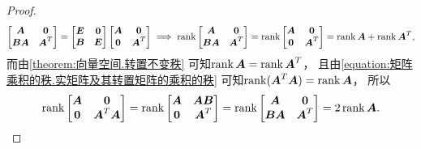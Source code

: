 \begin{example}
\begin{proof}
\begin{gather*}
	\begin{bmatrix}
		\boldsymbol{A} & \boldsymbol0 \\
		\boldsymbol{B} \boldsymbol{A} & \boldsymbol{A}^T
	\end{bmatrix}
	= \begin{bmatrix}
		\boldsymbol{E} & \boldsymbol0 \\
		\boldsymbol{B} & \boldsymbol{E}
	\end{bmatrix}
	\begin{bmatrix}
		\boldsymbol{A} & \boldsymbol0 \\
		\boldsymbol0 & \boldsymbol{A}^T
	\end{bmatrix}
	\implies
	\rank\begin{bmatrix}
		\boldsymbol{A} & \boldsymbol0 \\
		\boldsymbol{B} \boldsymbol{A} & \boldsymbol{A}^T
	\end{bmatrix}
	= \rank\begin{bmatrix}
		\boldsymbol{A} & \boldsymbol0 \\
		\boldsymbol0 & \boldsymbol{A}^T
	\end{bmatrix}
	= \rank\boldsymbol{A} + \rank\boldsymbol{A}^T,
\end{gather*}
而由\cref{theorem:向量空间.转置不变秩} 可知\(\rank\boldsymbol{A} = \rank\boldsymbol{A}^T\)，
且由\cref{equation:矩阵乘积的秩.实矩阵及其转置矩阵的乘积的秩} 可知\(\rank(\boldsymbol{A}^T \boldsymbol{A}) = \rank\boldsymbol{A}\)，
所以\begin{equation*}
	\rank\begin{bmatrix}
		\boldsymbol{A} & \boldsymbol0 \\
		\boldsymbol0 & \boldsymbol{A}^T \boldsymbol{A}
	\end{bmatrix}
	= \rank\begin{bmatrix}
		\boldsymbol{A} & \boldsymbol{A} \boldsymbol{B} \\
		\boldsymbol0 & \boldsymbol{A}^T
	\end{bmatrix}
	= \rank\begin{bmatrix}
		\boldsymbol{A} & \boldsymbol0 \\
		\boldsymbol{B} \boldsymbol{A} & \boldsymbol{A}^T
	\end{bmatrix}
	= 2 \rank\boldsymbol{A}.
\end{equation*}


\end{proof}
\end{example}
